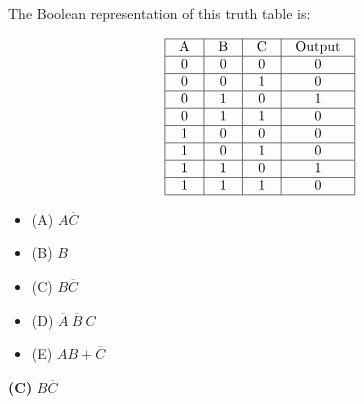 

The Boolean representation of this truth table is:


$$\vbox{\offinterlineskip
\halign{\strut
\vrule \quad\hfil # \ \hfil & 
\vrule \quad\hfil # \ \hfil & 
\vrule \quad\hfil # \ \hfil & 
\vrule \quad\hfil # \ \hfil \vrule \cr
\noalign{\hrule}
%
A & B & C & Output \cr
%
\noalign{\hrule}
%
0 & 0 & 0 & 0 \cr
%
\noalign{\hrule}
%
0 & 0 & 1 & 0 \cr
%
\noalign{\hrule}
%
0 & 1 & 0 & 1 \cr
%
\noalign{\hrule}
%
0 & 1 & 1 & 0 \cr
%
\noalign{\hrule}
%
1 & 0 & 0 & 0 \cr
%
\noalign{\hrule}
%
1 & 0 & 1 & 0 \cr
%
\noalign{\hrule}
%
1 & 1 & 0 & 1 \cr
%
\noalign{\hrule}
%
1 & 1 & 1 & 0 \cr
%
\noalign{\hrule}
} %
}$$ %

\begin{itemize}
\item{(A)} $A \overline{C}$
\vskip 5pt 
\item{(B)} $B$
\vskip 5pt 
\item{(C)} $B \overline{C}$
\vskip 5pt 
\item{(D)} $\overline{A} \> \overline{B} \> C$
\vskip 5pt 
\item{(E)} $AB + \overline{C}$
\end{itemize}







{\bf (C)} $B \overline{C}$
 










